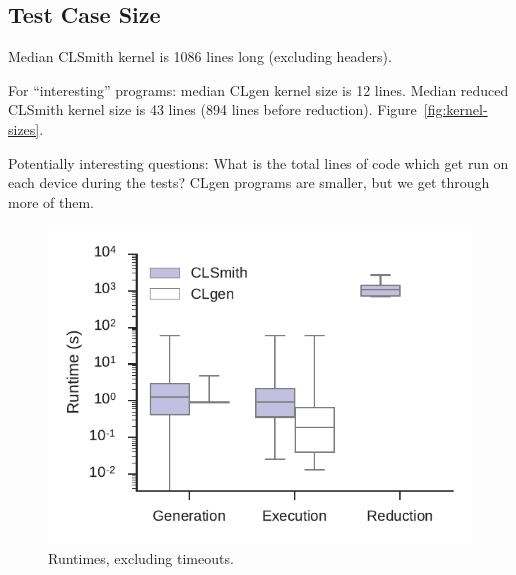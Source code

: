 

\subsection{Test Case Size}

Median CLSmith kernel is 1086 lines long (excluding headers).

For ``interesting'' programs: median CLgen kernel size is 12 lines. Median reduced CLSmith kernel size is 43 lines (894 lines before reduction). Figure~\ref{fig:kernel-sizes}.

Potentially interesting questions: What is the total lines of code which get run on each device during the tests? CLgen programs are smaller, but we get through more of them.



\begin{figure}
	\centering %
	\includegraphics[width=\columnwidth]{build/img/runtimes}%
	\caption{%
		Runtimes, excluding timeouts. %
	}%
	\label{fig:runtimes} %
\end{figure}


